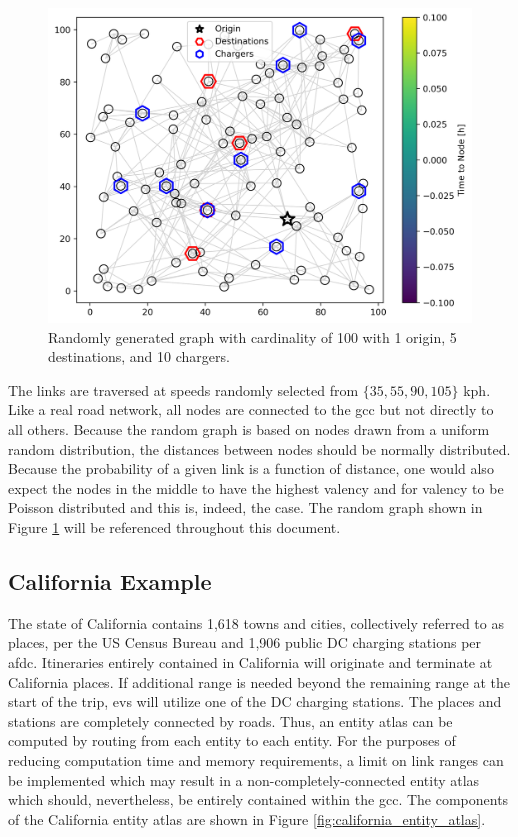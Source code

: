 \documentclass[12pt]{article}
\begin{document}
\begin{figure}[H]
	\centering
	\includegraphics[width = \linewidth * 2 / 3]{figs/random_graph.png}
	\caption{Randomly generated graph with cardinality of 100 with 1 origin, 5 destinations, and 10 chargers.}
	\label{fig:random_graph}
\end{figure}

The links are traversed at speeds randomly selected from $\{35, 55, 90, 105\}$ kph. Like a real road network, all nodes are connected to the \gls{gcc} but not directly to all others. Because the random graph is based on nodes drawn from a uniform random distribution, the distances between nodes should be normally distributed. Because the probability of a given link is a function of distance, one would also expect the nodes in the middle to have the highest valency and for valency to be Poisson distributed and this is, indeed, the case. The random graph shown in Figure \ref{fig:random_graph} will be referenced throughout this document.

\subsection*{California Example}

The state of California contains 1,618 towns and cities, collectively referred to as places, per the US Census Bureau and 1,906 public DC charging stations per \gls{afdc}. Itineraries entirely contained in California will originate and terminate at California places. If additional range is needed beyond the remaining range at the start of the trip, \glspl{ev} will utilize one of the DC charging stations. The places and stations are completely connected by roads. Thus, an entity atlas can be computed by routing from each entity to each entity. For the purposes of reducing computation time and memory requirements, a limit on link ranges can be implemented which may result in a non-completely-connected entity atlas which should, nevertheless, be entirely contained within the \gls{gcc}. The components of the California entity atlas are shown in Figure \ref{fig:california_entity_atlas}.
\end{document}
